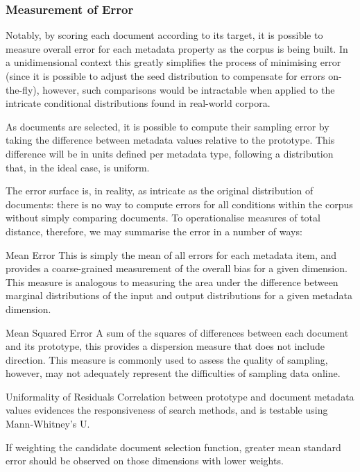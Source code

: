 \subsubsection{Measurement of Error}
\label{sec:rebuilding:method:errormeasure}
Notably, by scoring each document according to its target, it is possible to measure overall error for each metadata property as the corpus is being built.  In a unidimensional context this greatly simplifies the process of minimising error (since it is possible to adjust the seed distribution to compensate for errors on-the-fly), however, such comparisons would be intractable when applied to the intricate conditional distributions found in real-world corpora.



As documents are selected, it is possible to compute their sampling error by taking the difference between metadata values relative to the prototype.  This difference will be in units defined per metadata type, following a distribution that, in the ideal case, is uniform.

The error surface is, in reality, as intricate as the original distribution of documents: there is no way to compute errors for all conditions within the corpus without simply comparing documents.  To operationalise measures of total distance, therefore, we may summarise the error in a number of ways: 

\begin{itemizeTitle}

    \item[Mean Error] This is simply the mean of all errors for each metadata item, and provides a coarse-grained measurement of the overall bias for a given dimension.  This measure is analogous to measuring the area under the difference between marginal distributions of the input and output distributions for a given metadata dimension.

    \item[Mean Squared Error] A sum of the squares of differences between each document and its prototype, this provides a dispersion measure that does not include direction.  This measure is commonly used to assess the quality of sampling, however, may not adequately represent the difficulties of sampling data online.

    \item[Uniformality of Residuals] Correlation between prototype and document metadata values evidences the responsiveness of search methods, and is testable using Mann-Whitney's U.%

\end{itemizeTitle}



If weighting the candidate document selection function, greater mean standard error should be observed on those dimensions with lower weights.








